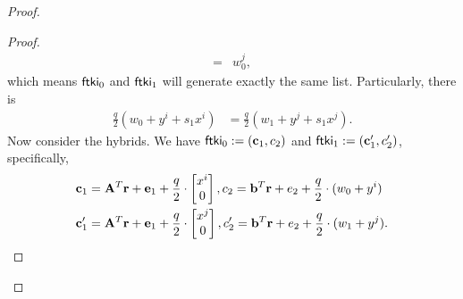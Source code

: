 \begin{proof}
\begin{proof}
\begin{align*}
    ={}& w_0^j,
\end{align*}
which means $\mathsf{ftki}_0$ and $\mathsf{ftki}_1$ will generate exactly the same list. Particularly, there is
\begin{align*}
    \frac{q}{2}(w_0+y^i+s_1x^i)
    &= \frac{q}{2}(w_1+y^j+s_1x^j).
\end{align*}
Now consider the hybrids. We have $\mathsf{ftki}_0:=(\mathbf{c}_1,c_2)$ and $\mathsf{ftki}_1:=(\mathbf{c}_1',c_2')$, specifically,
\begin{align*}
    \mathbf{c}_1 &= \mathbf{A}^T\mathbf{r}+\mathbf{e}_1+\frac{q}{2}\cdot\begin{bmatrix}x^i\\0\end{bmatrix},
     c_2 =\mathbf{b}^T\mathbf{r}+e_2+\frac{q}{2}\cdot(w_0+y^i)\\
    \mathbf{c}_1' &= \mathbf{A}^T\mathbf{r}+\mathbf{e}_1+\frac{q}{2}\cdot\begin{bmatrix}x^j\\0\end{bmatrix},
     c_2' =\mathbf{b}^T\mathbf{r}+e_2+\frac{q}{2}\cdot(w_1+y^j).
\end{align*}


\end{proof}
\end{proof}

